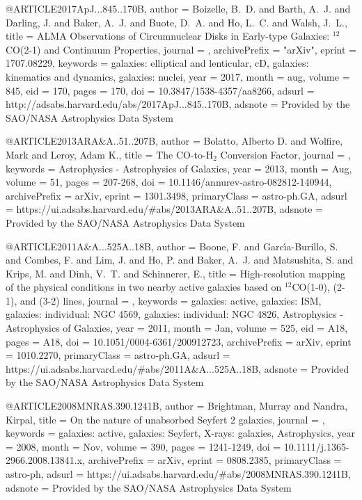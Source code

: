 \documentclass[longauth]{aa}
\begin{document}
@ARTICLE{2017ApJ...845..170B,
   author = {{Boizelle}, B.~D. and {Barth}, A.~J. and {Darling}, J. and {Baker}, A.~J. and {Buote}, D.~A. and {Ho}, L.~C. and {Walsh}, J.~L.},
    title = {ALMA Observations of Circumnuclear Disks in Early-type Galaxies: $^{12}$CO(2-1) and Continuum Properties},
  journal = {\apj},
archivePrefix = "arXiv",
   eprint = {1707.08229},
 keywords = {galaxies: elliptical and lenticular, cD, galaxies: kinematics and dynamics, galaxies: nuclei},
     year = 2017,
    month = aug,
   volume = 845,
      eid = {170},
    pages = {170},
      doi = {10.3847/1538-4357/aa8266},
   adsurl = {http://adsabs.harvard.edu/abs/2017ApJ...845..170B},
  adsnote = {Provided by the SAO/NASA Astrophysics Data System}
}

@ARTICLE{2013ARA&A..51..207B,
       author = {{Bolatto}, Alberto D. and {Wolfire}, Mark and {Leroy}, Adam K.},
        title = {The CO-to-H$_{2}$ Conversion Factor},
      journal = {\araa},
     keywords = {Astrophysics - Astrophysics of Galaxies},
         year = 2013,
        month = Aug,
       volume = {51},
        pages = {207-268},
          doi = {10.1146/annurev-astro-082812-140944},
archivePrefix = {arXiv},
       eprint = {1301.3498},
 primaryClass = {astro-ph.GA},
       adsurl = {https://ui.adsabs.harvard.edu/#abs/2013ARA&A..51..207B},
      adsnote = {Provided by the SAO/NASA Astrophysics Data System}
}

@ARTICLE{2011A&A...525A..18B,
       author = {{Boone}, F. and {Garc{\'\i}a-Burillo}, S. and {Combes}, F. and {Lim}, J. and {Ho}, P. and {Baker}, A.~J. and {Matsushita}, S. and {Krips}, M. and {Dinh}, V.~T. and {Schinnerer}, E.},
        title = {High-resolution mapping of the physical conditions in two nearby active galaxies based on $^{12}$CO(1-0), (2-1), and (3-2) lines},
      journal = {\aap},
     keywords = {galaxies: active, galaxies: ISM, galaxies: individual: NGC 4569, galaxies: individual: NGC 4826, Astrophysics - Astrophysics of Galaxies},
         year = 2011,
        month = Jan,
       volume = {525},
          eid = {A18},
        pages = {A18},
          doi = {10.1051/0004-6361/200912723},
archivePrefix = {arXiv},
       eprint = {1010.2270},
 primaryClass = {astro-ph.GA},
       adsurl = {https://ui.adsabs.harvard.edu/#abs/2011A&A...525A..18B},
      adsnote = {Provided by the SAO/NASA Astrophysics Data System}
}

@ARTICLE{2008MNRAS.390.1241B,
       author = {{Brightman}, Murray and {Nandra}, Kirpal},
        title = {On the nature of unabsorbed Seyfert 2 galaxies},
      journal = {\mnras},
     keywords = {galaxies: active, galaxies: Seyfert, X-rays: galaxies, Astrophysics},
         year = 2008,
        month = Nov,
       volume = {390},
        pages = {1241-1249},
          doi = {10.1111/j.1365-2966.2008.13841.x},
archivePrefix = {arXiv},
       eprint = {0808.2385},
 primaryClass = {astro-ph},
       adsurl = {https://ui.adsabs.harvard.edu/#abs/2008MNRAS.390.1241B},
      adsnote = {Provided by the SAO/NASA Astrophysics Data System}
}
\end{document}
